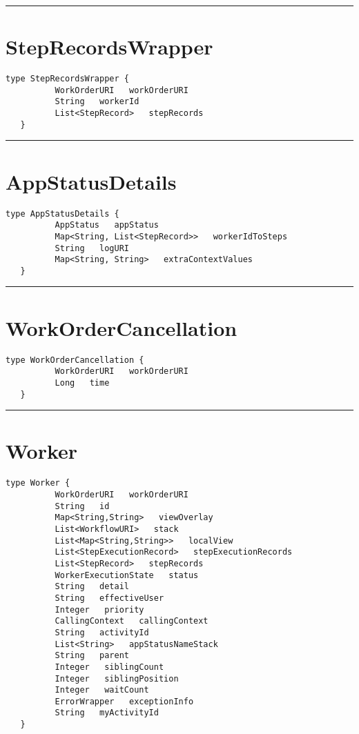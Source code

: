 \rule{12cm}{2pt}
\section{StepRecordsWrapper}
\label{type:StepRecordsWrapper}

\begin{lstlisting}[style=nonumbers]
   type StepRecordsWrapper {
          WorkOrderURI   workOrderURI
          String   workerId
          List<StepRecord>   stepRecords
   }
\end{lstlisting}

\rule{12cm}{2pt}
\section{AppStatusDetails}
\label{type:AppStatusDetails}

\begin{lstlisting}[style=nonumbers]
   type AppStatusDetails {
          AppStatus   appStatus
          Map<String, List<StepRecord>>   workerIdToSteps
          String   logURI
          Map<String, String>   extraContextValues
   }
\end{lstlisting}

\rule{12cm}{2pt}
\section{WorkOrderCancellation}
\label{type:WorkOrderCancellation}

\begin{lstlisting}[style=nonumbers]
   type WorkOrderCancellation {
          WorkOrderURI   workOrderURI
          Long   time
   }
\end{lstlisting}

\rule{12cm}{2pt}
\section{Worker}
\label{type:Worker}

\begin{lstlisting}[style=nonumbers]
   type Worker {
          WorkOrderURI   workOrderURI
          String   id
          Map<String,String>   viewOverlay
          List<WorkflowURI>   stack
          List<Map<String,String>>   localView
          List<StepExecutionRecord>   stepExecutionRecords
          List<StepRecord>   stepRecords
          WorkerExecutionState   status
          String   detail
          String   effectiveUser
          Integer   priority
          CallingContext   callingContext
          String   activityId
          List<String>   appStatusNameStack
          String   parent
          Integer   siblingCount
          Integer   siblingPosition
          Integer   waitCount
          ErrorWrapper   exceptionInfo
          String   myActivityId
   }
\end{lstlisting}


